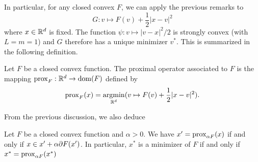 In particular, for any closed convex $F$, we can apply the previous remarks to 
\[
G:  v \mapsto F(v) + \frac1{2} |x-v|^2
\]
where  $x\in {\mathbb{R}}^d$ is fixed. The function $\psi: v\mapsto |v-x|^2/2$ is strongly convex (with $L=m = 1$) and $G$ therefore has a unique minimizer $v^*$. This is summarized in the following definition.
\begin{definition}
\label{def:proximal}
Let $F$ be a closed convex function. The proximal operator associated to $F$  is the mapping $\operatorname{prox}_{F} : {\mathbb{R}}^d \to \mathrm{dom}(F)$ defined by
\begin{equation}
\label{eq:proximal}
\operatorname{prox}_{F}(x) = \operatorname*{argmin}_{{\mathbb{R}}^d} (v\mapsto  F(v) + \frac1{2} |x-v|^2).
\end{equation}
\end{definition}

From the previous discussion, we also deduce
\begin{proposition}
\label{prop:proximal.subg}
Let $F$ be a closed convex function and $\alpha>0$.
We have $x' = \operatorname{prox}_{\alpha F}(x)$ if and only if $x\in x'+\alpha \partial F(x')$. In particular, $x^*$ is a minimizer of $F$ if and only if $x^* = \operatorname{prox}_{\alpha F}(x^*)$ 
\end{proposition}

